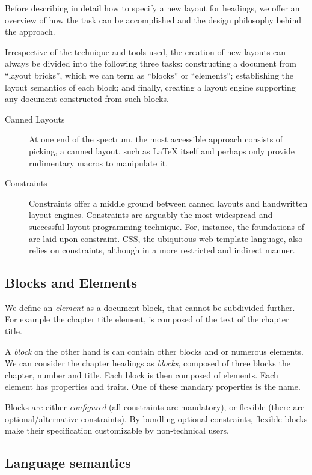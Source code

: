 Before describing in detail how to specify a new layout for headings, we offer an overview of how the task can be accomplished and the design philosophy behind the approach. 

Irrespective of the technique and tools used, the creation of new layouts can always be divided into the following three tasks: constructing a document from “layout bricks”, which we can term as “blocks” or “elements”; establishing the layout semantics of each block; and finally, creating a layout engine supporting any document constructed from such blocks.

\begin{description}
\item [Canned Layouts] At one end of the spectrum, the most accessible approach consists of picking, a canned layout, such as LaTeX itself and perhaps only provide rudimentary macros to manipulate it.
\item [Constraints] Constraints offer a middle ground between canned layouts and handwritten layout engines. Constraints are arguably the most widespread and successful layout programming technique. For, instance, the foundations of \tex are laid upon constraint. CSS, the ubiquitous web template language, also relies on constraints, although in a more restricted and indirect manner.
\end{description}

\subsection{Blocks and Elements}

We define an \emph{element} as a document block, that cannot be subdivided further. For example the chapter title element, is composed of the text of the chapter title. 

A \emph{block} on the other hand is can contain other blocks and or numerous elements. We can consider the chapter headings as \emph{blocks}, composed of three blocks the chapter, number and title. Each block is then composed of elements. Each element has properties and traits. One of these mandary properties is the name. 

Blocks are either \emph{configured} (all constraints are mandatory), or flexible (there are optional/alternative constraints). By bundling optional constraints, flexible blocks make their specification customizable by non-technical users. 

\subsection{Language semantics}


